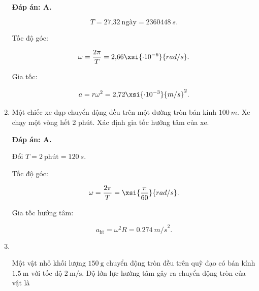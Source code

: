 \begin{enumerate}[label=\bfseries Câu \arabic*:,leftmargin=1.5cm]
	\hideall
	{	
		\textbf{Đáp án: A.}
		
		$$T = \text{27,32}\ \text{ngày} = \SI{2360448}{s}.$$
		
		Tốc độ góc:
		
		$$\omega = \dfrac{2\pi}{T} = \text{2,66} \xsi{\cdot 10^{-6}}{rad/s}.$$
		
		Gia tốc:
		
		$$a = r \omega^2 = \text{2,72} \xsi{\cdot 10^{-3}}{m/s}^2.$$
	}
	
	\item {}
	
	
	{Một chiếc xe đạp chuyển động đều trên một đường tròn bán kính $\SI{100}{m}$. Xe chạy một vòng hết 2 phút. Xác định gia tốc hướng tâm của xe.
	}
	
	\hideall
	{	
		\textbf{Đáp án: A.}
		
		Đổi $T = 2\ \text{phút} = \SI{120}{s}.$
		
		Tốc độ góc:
		
		$$\omega = \dfrac{2\pi}{T} = \xsi{\dfrac{\pi}{60}}{rad/s}.$$
		
		Gia tốc hướng tâm:
		
		$$a_\text{ht} = \omega^2 R = \SI{0,274}{m/s}^2.$$
	}
	
	\item {}\\
	{Một vật nhỏ khối lượng $\SI{150}{\gram}$ chuyển động tròn đều trên quỹ đạo có bán kính $\SI{1.5}{\meter}$ với tốc độ $\SI{2}{\meter/\second}$. Độ lớn lực hướng tâm gây ra chuyển động tròn của vật là
	
}
	

\end{enumerate}
